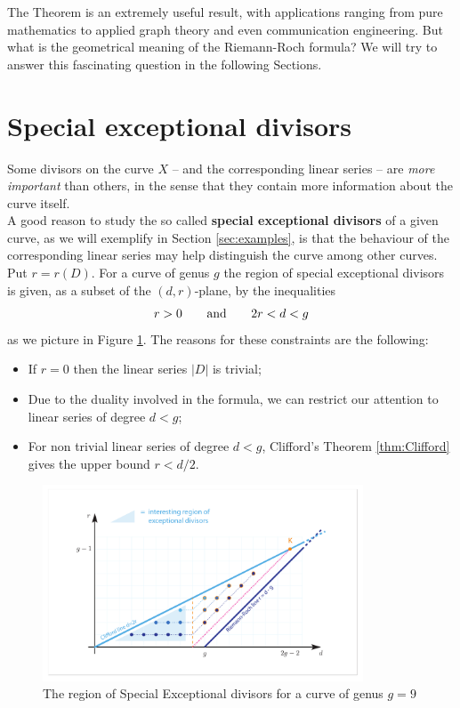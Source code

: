 	The \RR Theorem is an extremely useful result, with applications ranging from pure mathematics to applied graph theory and even communication engineering. But what is the geometrical meaning of the Riemann-Roch formula? We will try to answer this fascinating question in the following Sections.
	

\section{Special exceptional divisors}\label{sec:special}

	Some divisors on the curve $X$ -- and the corresponding linear series -- are \emph{more important} than others, in the sense that they contain more information about the curve itself.\\ 
	A good reason to study the so called \textbf{special exceptional divisors} of a given curve, as we will exemplify in Section \ref{sec:examples}, is that the behaviour of the corresponding linear series may help distinguish the curve among other curves.\\
	Put $r=r(D)$. For a curve of genus $g$ the region of special exceptional divisors is given, as a subset of the $(d,r)$-plane, by the inequalities
	$$ r>0 \qquad \text{and} \qquad 2r<d<g $$ 
	as we picture in Figure \ref{fig:Exceptional_Divisors}. The reasons for these constraints are the following:
	\begin{itemize}
		\item If $r=0$ then the linear series $|D|$ is trivial;
		\item Due to the duality involved in the \RR formula, we can restrict our attention to linear series of degree $d<g$;
		\item For non trivial linear series of degree $d<g$, Clifford's Theorem \ref{thm:Clifford} gives the upper bound $r<d/2$.
	\end{itemize}

	\begin{figure}[ht]
		\centering
		\includegraphics[width=0.85\textwidth]{Exceptional_Divisors_new.pdf}
		\caption{ The region of Special Exceptional divisors for a curve of genus $g=9$ }
		\label{fig:Exceptional_Divisors}
	\end{figure}


